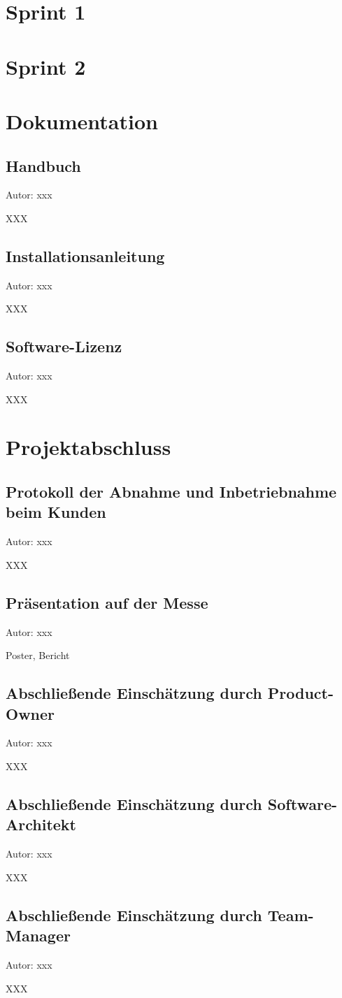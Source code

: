 \documentclass[twoside]{report}
\begin{document}
\section{Sprint 1}



\section{Sprint 2}




\section{Dokumentation}

\subsection{Handbuch}
{\small Autor: xxx}

XXX

\subsection{Installationsanleitung}
{\small Autor: xxx}

XXX

\subsection{Software-Lizenz}
{\small Autor: xxx}

XXX


\section{Projektabschluss}

\subsection{Protokoll der Abnahme und Inbetriebnahme beim Kunden}
{\small Autor: xxx}

XXX

\subsection{Präsentation auf der Messe}
{\small Autor: xxx}

Poster, Bericht

\subsection{Abschließende Einschätzung durch Product-Owner}
{\small Autor: xxx}

XXX

\subsection{Abschließende Einschätzung durch Software-Architekt}
{\small Autor: xxx}

XXX

\subsection{Abschließende Einschätzung durch Team-Manager}
{\small Autor: xxx}

XXX
\end{document}
